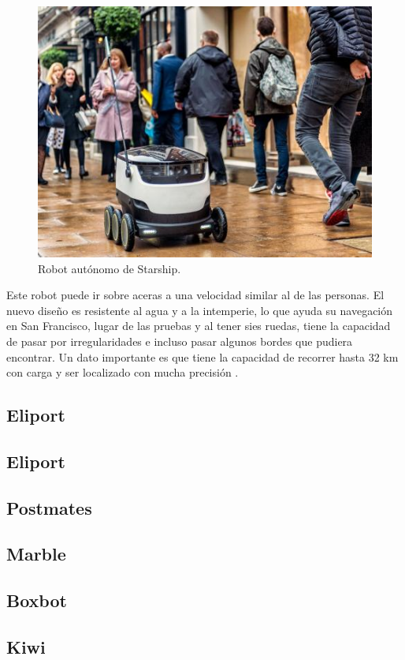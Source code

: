	\begin{figure}[hbtp]
	\centering
	\includegraphics[scale=0.5]{Figures/Starship_Picture.jpg}
	\caption{Robot autónomo de Starship\cite{starship_picture}.} 
	\end{figure}

Este robot puede ir sobre aceras a una velocidad similar al de las personas. El nuevo diseño es resistente al agua y a la intemperie, lo que ayuda su navegación en San Francisco, lugar de las pruebas y al tener sies ruedas, tiene la capacidad de pasar por irregularidades e incluso pasar algunos bordes que pudiera encontrar. Un dato importante es que tiene la capacidad de recorrer hasta 32 km con carga y ser localizado con mucha precisión \cite{robby_zdnet}.

\subsection{Eliport} 
\subsection{Eliport} 
\subsection{Postmates} 
\subsection{Marble} 
\subsection{Boxbot} 
\subsection{Kiwi} 
